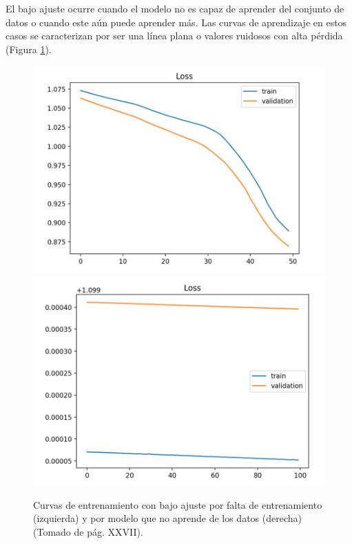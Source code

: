 El bajo ajuste ocurre cuando el modelo no es capaz de aprender del conjunto de datos o cuando este aún puede aprender 
más. Las curvas de aprendizaje en estos casos se caracterizan por ser una línea plana o valores ruidosos con alta pérdida
(Figura \ref{fig:underfit}).

\begin{figure}[h!]
	\begin{center}
		\includegraphics[scale=.2]{Graphics/underfit_missing_training.png}
		\includegraphics[scale=.2]{Graphics/underfit_not_learning.png}
		\caption{Curvas de entrenamiento con bajo ajuste por falta de entrenamiento (izquierda) 
		y por modelo que no aprende de los datos (derecha) (Tomado de \textcite{brownlee2018better} pág. XXVII).}\label{fig:underfit}
	\end{center}
\end{figure}

